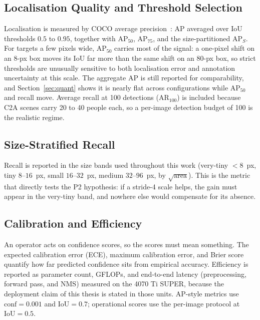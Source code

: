 \documentclass[12pt,a4paper,oneside]{report}
\begin{document}
\subsection{Localisation Quality and Threshold Selection}
Localisation is measured by COCO average precision~\cite{lin2014coco}:
$\mathrm{AP}$ averaged
over IoU thresholds $0.5$ to $0.95$, together with $\mathrm{AP}_{50}$,
$\mathrm{AP}_{75}$, and the size-partitioned $\mathrm{AP}_S$. For targets a
few pixels wide, $\mathrm{AP}_{50}$ carries most of the signal: a one-pixel
shift on an 8-px box moves its IoU far more than the same shift on an 80-px
box, so strict thresholds are unusually sensitive to both localisation error
and annotation uncertainty at this scale. The aggregate AP is still reported for
comparability, and Section~\ref{sec:quant} shows it is nearly flat across
configurations while $\mathrm{AP}_{50}$ and recall move. Average recall at
100 detections ($\mathrm{AR}_{100}$) is included because C2A scenes carry 20
to 40 people each, so a per-image detection budget of 100 is the realistic
regime.

\subsection{Size-Stratified Recall}
Recall is reported in the size bands used throughout this work (very-tiny
$<8$~px, tiny $8$--$16$~px, small $16$--$32$~px, medium $32$--$96$~px, by
$\sqrt{\text{area}}$). This is the metric that directly tests the P2
hypothesis: if a stride-4 scale helps, the gain must appear in the very-tiny
band, and nowhere else would compensate for its absence.

\subsection{Calibration and Efficiency}
An operator acts on confidence scores, so the scores must mean something. The
expected calibration error (ECE), maximum calibration error, and Brier score
quantify how far predicted confidence sits from empirical accuracy.
Efficiency is reported as parameter count, GFLOPs, and end-to-end latency
(preprocessing, forward pass, and NMS) measured on the 4070 Ti SUPER, because
the deployment claim of this thesis is stated in those units. AP-style
metrics use $\text{conf} = 0.001$ and $\text{IoU} = 0.7$; operational scores
use the per-image protocol at $\text{IoU} = 0.5$.
\end{document}
